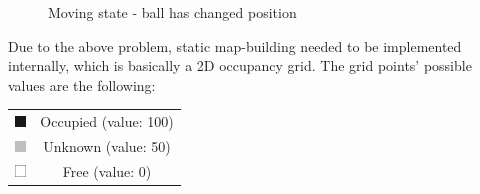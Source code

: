 \begin{figure}[!ht]
    \centering
    \caption{Moving state - ball has changed position}
    \label{gmapping_drawback_after_move}
\end{figure}

Due to the above problem, static map-building needed to be implemented internally, which is basically a 2D occupancy grid. The grid points' possible values are the following:

\begin{center}
    \begin{tabular}{ c c }
        \includegraphics[height=3mm]{figures/raw/map_occupied.png} & Occupied (value: 100) \\
        \includegraphics[height=3mm]{figures/raw/map_unknown.png}  & Unknown (value: 50)   \\
        \includegraphics[height=3mm]{figures/raw/map_free.png}     & Free (value: 0)       \\
    \end{tabular}
\end{center}

